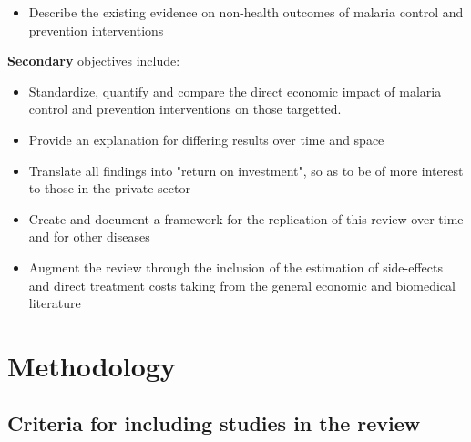 \documentclass{article}
\begin{document}
\begin{itemize}
\item Describe the existing evidence on non-health outcomes of malaria control and prevention interventions
\end{itemize}


\noindent \textbf{Secondary} objectives include: 
\begin{itemize}
  \setlength\itemsep{-0.2em}

\item Standardize, quantify and compare the direct economic impact of malaria control and prevention interventions on those targetted. 
\item Provide an explanation for differing results over time and space 
\item Translate all findings into "return on investment", so as to be of more interest to those in the private sector
\item Create and document a framework for the replication of this review over time and for other diseases  
\item Augment the review through the inclusion of the estimation of side-effects and direct treatment costs taking from the general economic and biomedical literature
\end{itemize}


\section*{Methodology}

\subsection*{Criteria for including studies in the review}

\vspace{-2mm}
\end{document}
